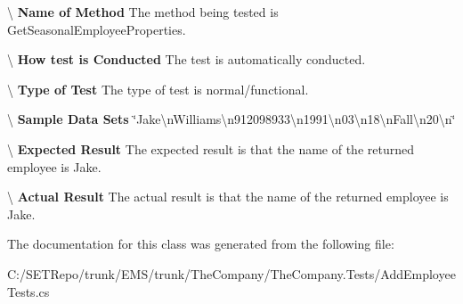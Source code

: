\textbackslash{} {\bfseries  Name of Method} The method being tested is Get\+Seasonal\+Employee\+Properties.

\textbackslash{} {\bfseries  How test is Conducted} The test is automatically conducted.

\textbackslash{} {\bfseries  Type of Test} The type of test is normal/functional.

\textbackslash{} {\bfseries  Sample Data Sets} \char`\"{}\+Jake\textbackslash{}n\+Williams\textbackslash{}n912098933\textbackslash{}n1991\textbackslash{}n03\textbackslash{}n18\textbackslash{}n\+Fall\textbackslash{}n20\textbackslash{}n\char`\"{}

\textbackslash{} {\bfseries  Expected Result} The expected result is that the name of the returned employee is Jake.

\textbackslash{} {\bfseries  Actual Result} The actual result is that the name of the returned employee is Jake. 

The documentation for this class was generated from the following file\+:\begin{DoxyCompactItemize}
\item 
C\+:/\+S\+E\+T\+Repo/trunk/\+E\+M\+S/trunk/\+The\+Company/\+The\+Company.\+Tests/Add\+Employee\+Tests.\+cs\end{DoxyCompactItemize}
